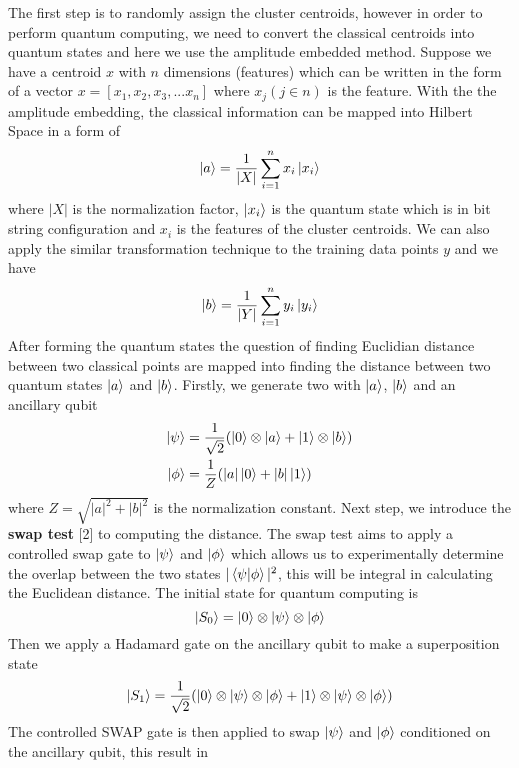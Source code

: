 \documentclass{article}
\begin{document}
The first step is to randomly assign the cluster centroids, however in order to perform quantum computing, we need to convert the classical centroids into quantum states and here we use the amplitude embedded method. Suppose we have a centroid $x$ with $n$ dimensions (features) which can be written in the form of a vector $x=[x_1,x_2,x_3,... x_n]$ where $x_j (j\in n)$ is the feature. With the the amplitude embedding, the classical information can be mapped into Hilbert Space in a form of
\begin{equation}
\ket{a}=\frac{1}{|X|}\sum_{i=1}^nx_i\ket{x_i}
\end{equation}
where $|X|$ is the normalization factor, $\ket{x_i}$ is the quantum state which is in bit string configuration and $x_i$ is the features of the cluster centroids. We can also apply the similar transformation technique to the training data points $y$ and we have 
\begin{equation}
\ket{b}=\frac{1}{|Y|}\sum_{i=1}^ny_i\ket{y_i}
\end{equation}
After forming the quantum states the question of finding Euclidian distance between two classical points are mapped into finding the distance between two quantum states $\ket{a}$ and $\ket{b}$. 
Firstly, we generate two with $\ket{a}$, $\ket{b}$ and an ancillary qubit
\begin{align}
    \ket{\psi}&=\frac{1}{\sqrt{2}}(\ket{0}\otimes\ket{a}+\ket{1}\otimes\ket{b})\\
    \ket{\phi}&=\frac{1}{Z}(|a|\ket{0}+|b|\ket{1})
\end{align}
where $Z= \sqrt{|a|^2+|b|^2}$ is the normalization constant. Next step, we introduce the \textbf{swap test} [2] to computing the distance. The swap test aims to apply a controlled swap gate to $\ket{\psi}$ and $\ket{\phi}$ which allows us to experimentally determine the overlap between the two states $|\bra{\psi}\ket{\phi}|^2$, this will be integral in calculating the Euclidean distance. The initial state for quantum computing is
\begin{equation}
\ket{S_0}=\ket{0}\otimes\ket{\psi}\otimes\ket{\phi}
\end{equation}
Then we apply a Hadamard gate on the ancillary qubit to make a superposition state
\begin{equation}
\ket{S_1}=\frac{1}{\sqrt{2}}(\ket{0}\otimes\ket{\psi}\otimes\ket{\phi}+\ket{1}\otimes\ket{\psi}\otimes\ket{\phi})
\end{equation}
The controlled SWAP gate is then applied to swap  $\ket{\psi}$ and $\ket{\phi}$ conditioned on the ancillary qubit, this result in
\end{document}
